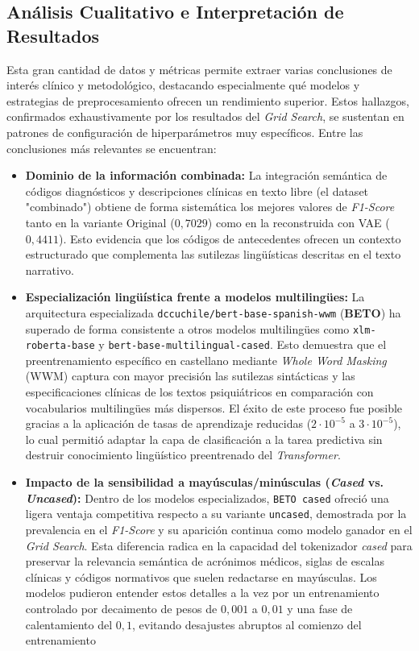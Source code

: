 \documentclass[12pt,a4paper,onecolumn,oneside]{report}
\begin{document}
\subsection{Análisis Cualitativo e Interpretación de Resultados}

Esta gran cantidad de datos y métricas permite extraer varias conclusiones de interés clínico y metodológico, destacando especialmente qué modelos y estrategias de preprocesamiento ofrecen un rendimiento superior. Estos hallazgos, confirmados exhaustivamente por los resultados del \textit{Grid Search}, se sustentan en patrones de configuración de hiperparámetros muy específicos. Entre las conclusiones más relevantes se encuentran:

\begin{itemize}
    \item \textbf{Dominio de la información combinada:} La integración semántica de códigos diagnósticos y descripciones clínicas en texto libre (el dataset "combinado") obtiene de forma sistemática los mejores valores de \textit{F1-Score} tanto en la variante Original ($0,7029$) como en la reconstruida con VAE ($0,4411$). Esto evidencia que los códigos de antecedentes ofrecen un contexto estructurado que complementa las sutilezas lingüísticas descritas en el texto narrativo. 
        
    \item \textbf{Especialización lingüística frente a modelos multilingües:} La arquitectura especializada \texttt{dccuchile/bert-base-spanish-wwm} (\textbf{BETO}) ha superado de forma consistente a otros modelos multilingües como \texttt{xlm-roberta-base} y \texttt{bert-base-multilingual-cased}. Esto demuestra que el preentrenamiento específico en castellano mediante \textit{Whole Word Masking} (WWM) captura con mayor precisión las sutilezas sintácticas y las especificaciones clínicas de los textos psiquiátricos en comparación con vocabularios multilingües más dispersos. El éxito de este proceso fue posible gracias a la aplicación de tasas de aprendizaje reducidas ($2\cdot 10^{-5}$ a $3\cdot 10^{-5}$), lo cual permitió adaptar la capa de clasificación a la tarea predictiva sin destruir conocimiento lingüístico preentrenado del \textit{Transformer}.
    
    \item \textbf{Impacto de la sensibilidad a mayúsculas/minúsculas (\textit{Cased} vs. \textit{Uncased}):} Dentro de los modelos especializados, \texttt{BETO cased} ofreció una ligera ventaja competitiva respecto a su variante \texttt{uncased}, demostrada por la prevalencia en el \textit{F1-Score} y su aparición continua como modelo ganador en el \textit{Grid Search}. Esta diferencia radica en la capacidad del tokenizador \textit{cased} para preservar la relevancia semántica de acrónimos médicos, siglas de escalas clínicas y códigos normativos que suelen redactarse en mayúsculas. Los modelos pudieron entender estos detalles a la vez por un entrenamiento controlado por decaimento de pesos de $0,001$ a $0,01$  y una fase de calentamiento del $0,1$, evitando desajustes abruptos al comienzo del entrenamiento
    

\end{itemize}
\end{document}
